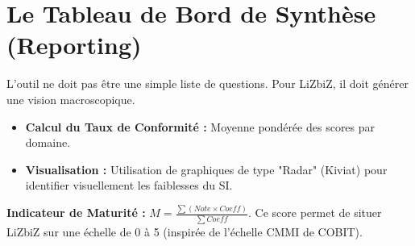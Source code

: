 \section{Le Tableau de Bord de Synthèse (Reporting)}

L'outil ne doit pas être une simple liste de questions. Pour LiZbiZ, il doit générer une vision macroscopique.

\begin{itemize}
    \item \textbf{Calcul du Taux de Conformité :} Moyenne pondérée des scores par domaine.
    \item \textbf{Visualisation :} Utilisation de graphiques de type "Radar" (Kiviat) pour identifier visuellement les faiblesses du SI.
\end{itemize}

\begin{boxdef}{}
	\textbf{Indicateur de Maturité :} 
	$M = \frac{\sum (Note \times Coeff)}{\sum Coeff}$.
Ce score permet de situer LiZbiZ sur une échelle de 0 à 5 (inspirée de l'échelle CMMI de COBIT).
\end{boxdef}
